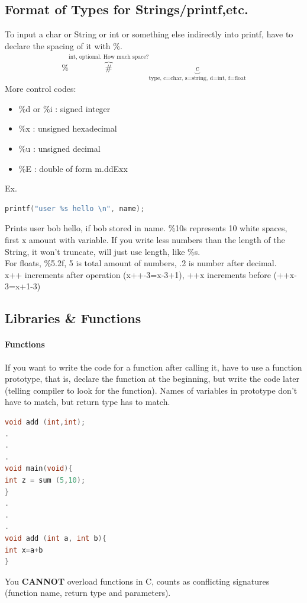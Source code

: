 \documentclass[12 pt]{article}
\begin{document}
\subsection{Format of Types for Strings/printf,etc.}
To input a char or String or int or something else indirectly into printf, have to declare the spacing of it with \%. 
\begin{align*}
	\% \overbrace{\#}^{\text{int, optional. How much space?}}\underbrace{c}_{\text{type, c=char, s=string, d=int, f=float}}
\end{align*}
More control codes: 
\begin{itemize}
	\item \%d or \%i : signed integer
	\item \%x : unsigned hexadecimal
	\item \%u : unsigned decimal
	\item \%E : double of form m.ddExx
\end{itemize}
Ex. 
\begin{lstlisting}[language=c]
printf("user %s hello \n", name);
\end{lstlisting}
Prints user bob hello, if bob stored in name. \%10s represents 10 white spaces, first x amount with variable. If you write less numbers than the length of the String, it won't truncate, will just use length, like \%s.
\\ For floats, \%5.2f, 5 is total amount of numbers, .2 is number after decimal.
\\ x++ increments after operation (x++-3=x-3+1), ++x increments before (++x-3=x+1-3)
\subsection{Libraries \& Functions}
\paragraph{Functions} If you want to write the code for a function after calling it, have to use a function prototype, that is, declare the function at the beginning, but write the code later (telling compiler to look for the function). Names of variables in prototype don't have to match, but return type has to match.
\begin{lstlisting}[language=c]
void add (int,int);
.
.
.
void main(void){
int z = sum (5,10);
}
.
.
.
void add (int a, int b){
int x=a+b
}
\end{lstlisting}
You \textbf{CANNOT} overload functions in C, counts as conflicting signatures (function name, return type and parameters).
\end{document}
